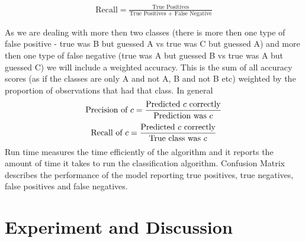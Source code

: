 \documentclass{article}
\begin{document}
\begin{multicols}{2}
\begin{align*}
\mbox{Recall} = \frac{\mbox{True Positives}}{\mbox{True Positives + False Negative}}
\end{align*}

As we are dealing with more then two classes (there is more then one type of false positive - true was B but guessed A vs true was C but guessed A) and more then one type of false negative (true was A but guessed B vs true was A but guessed C) we will include a weighted accuracy. This is the sum of all accuracy scores (as if the classes are only A and not A, B and not B etc) weighted by the proportion of observations that had that class. In general
\begin{align*}
    \mbox{Precision of }c = {\mbox{Predicted } c \mbox{ correctly} \over \mbox{Prediction was } c}
\end{align*}
\begin{align*}
    \mbox{Recall of }c = {\mbox{Predicted } c \mbox{ correctly} \over \mbox{True class was } c}
\end{align*}
Run time measures the time efficiently of the algorithm and it reports the amount of time it takes to run the classification algorithm. Confusion Matrix describes the performance of the model reporting true positives, true negatives, false positives and false negatives. 


\section{Experiment and Discussion}

\end{multicols}
\end{document}
